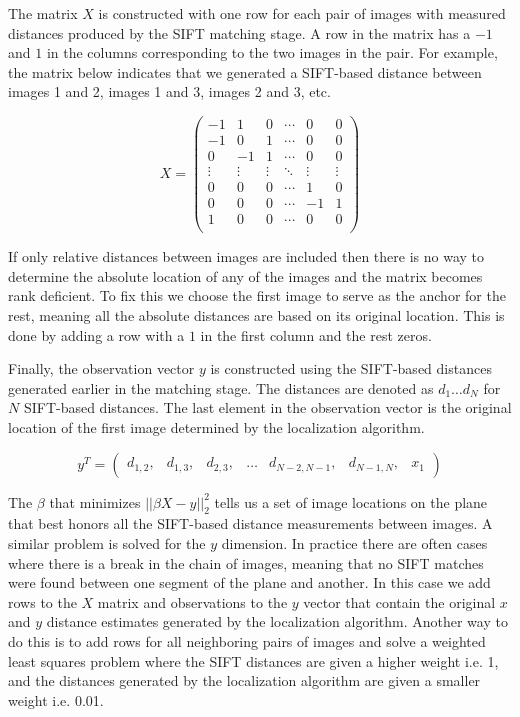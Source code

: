 \documentclass[10pt,twocolumn,letterpaper]{article}
\begin{document}
The matrix $X$ is constructed with one row for each pair of images
with measured distances produced by the SIFT matching stage. A row in
the matrix has a $-1$ and $1$ in the columns corresponding to the two
images in the pair. For example, the matrix below indicates that we
generated a SIFT-based distance between images 1 and 2, images 1 and
3, images 2 and 3, etc.

\[
X =
\begin{pmatrix}
  -1 & 1 & 0 & \cdots & 0 & 0\\
  -1 & 0 & 1 & \cdots & 0 & 0\\
  0 & -1 & 1 & \cdots & 0 & 0\\
  \vdots  & \vdots & \vdots & \ddots & \vdots  & \vdots\\
  0 & 0 & 0 & \cdots & 1 & 0 \\
  0 & 0 & 0 & \cdots & -1 & 1 \\
  1 & 0 & 0 & \cdots & 0 & 0 \\
\end{pmatrix}
\]

If only relative distances between images are included then there is
no way to determine the absolute location of any of the images and the
matrix becomes rank deficient. To fix this we choose the first image
to serve as the anchor for the rest, meaning all the absolute
distances are based on its original location. This is done by adding a
row with a $1$ in the first column and the rest zeros.

Finally, the observation vector $y$ is constructed using the
SIFT-based distances generated earlier in the matching stage. The
distances are denoted as $d_1 \dots d_N$ for $N$ SIFT-based
distances. The last element in the observation vector is the original
location of the first image determined by the localization algorithm.

\[
y^T =
\begin{pmatrix}
  d_{1,2}, &d_{1,3}, &d_{2,3}, &\hdots &d_{N-2,N-1}, &d_{N-1,N}, &x_1
\end{pmatrix}
\]

The $\beta$ that minimizes $||\beta X - y||_2^2$ tells us a set of
image locations on the plane that best honors all the SIFT-based
distance measurements between images. A similar problem is solved for
the $y$ dimension. In practice there are often cases where there is a
break in the chain of images, meaning that no SIFT matches were found
between one segment of the plane and another. In this case we add rows
to the $X$ matrix and observations to the $y$ vector that contain the
original $x$ and $y$ distance estimates generated by the localization
algorithm. Another way to do this is to add rows for all neighboring
pairs of images and solve a weighted least squares problem where the
SIFT distances are given a higher weight i.e. 1, and the distances
generated by the localization algorithm are given a smaller weight
i.e. 0.01.
\end{document}
